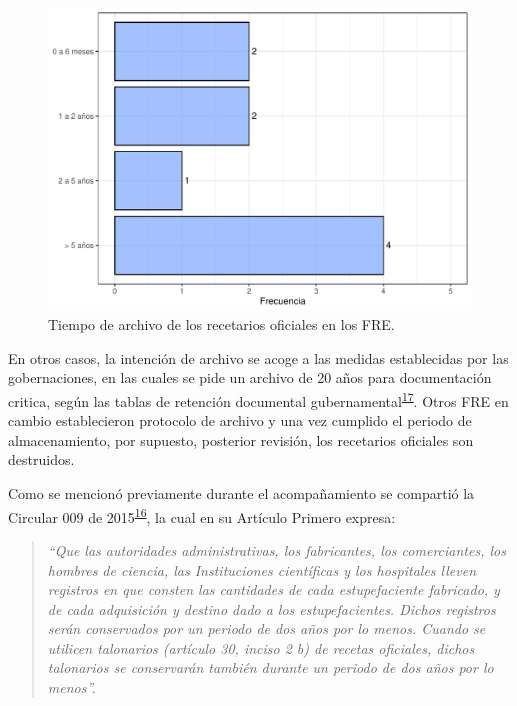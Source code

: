 \documentclass[
  oneside]{book}
\begin{document}
\begin{figure}[t]

{\centering \includegraphics[width=0.85\linewidth]{InformeFinal_files/figure-latex/TiempoArchivoRecetariosOficiales-1} 

}

\caption{Tiempo de archivo de los recetarios oficiales en los FRE.}\label{fig:TiempoArchivoRecetariosOficiales}
\end{figure}

En otros casos, la intención de archivo se acoge a las medidas establecidas por las gobernaciones, en las cuales se pide un archivo de 20 años para documentación critica, según las tablas de retención documental gubernamental\textsuperscript{\protect\hyperlink{ref-PresidenciadelaRepublicadeColombia2012}{17}}. Otros FRE en cambio establecieron protocolo de archivo y una vez cumplido el periodo de almacenamiento, por supuesto, posterior revisión, los recetarios oficiales son destruidos.

Como se mencionó previamente durante el acompañamiento se compartió la Circular 009 de 2015\textsuperscript{\protect\hyperlink{ref-FNE2015-9}{16}}, la cual en su Artículo Primero expresa:

\begin{quote}
\emph{``Que las autoridades administrativas, los fabricantes, los comerciantes, los hombres de ciencia, las Instituciones científicas y los hospitales lleven registros en que consten las cantidades de cada estupefaciente fabricado, y de cada adquisición y destino dado a los estupefacientes. Dichos registros serán conservados por un periodo de dos años por lo menos. Cuando se utilicen talonarios (artículo 30, inciso 2 b) de recetas oficiales, dichos talonarios se conservarán también durante un periodo de dos años por lo menos''.}
\end{quote}
\end{document}
